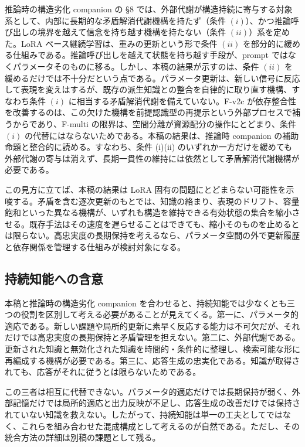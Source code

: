 \documentclass[12pt,a4paper]{article}
\begin{document}
推論時の構造劣化 companion の §8 では、外部代謝が構造持続に寄与する対象系として、内部に長期的な矛盾解消代謝機構を持たず（条件 \((i)\)）、かつ推論呼び出しの境界を越えて信念を持ち越す機構を持たない（条件 \((ii)\)）系を定めた。LoRA ベース継続学習は、重みの更新という形で条件 \((ii)\) を部分的に緩める仕組みである。推論呼び出しを越えて状態を持ち越す手段が、prompt ではなくパラメータそのものに移る。しかし、本稿の結果が示すのは、条件 \((ii)\) を緩めるだけでは不十分だという点である。パラメータ更新は、新しい信号に反応して表現を変えはするが、既存の派生知識との整合を自律的に取り直す機構、すなわち条件 \((i)\) に相当する矛盾解消代謝を備えていない。F-v2c が依存整合性を改善するのは、この欠けた機構を前提認識型の再提示という外部プロセスで補うからであり、F-multi の限界は、空間分離が資源配分の操作にとどまり、条件 \((i)\) の代替にはならないためである。本稿の結果は、推論時 companion の補助命題と整合的に読める。すなわち、条件 (i)(ii) のいずれか一方だけを緩めても外部代謝の寄与は消えず、長期一貫性の維持には依然として矛盾解消代謝機構が必要である。

この見方に立てば、本稿の結果は LoRA 固有の問題にとどまらない可能性を示唆する。矛盾を含む逐次更新のもとでは、知識の絡まり、表現のドリフト、容量飽和といった異なる機構が、いずれも構造を維持できる有効状態の集合を縮小させる。既存手法はその速度を遅らせることはできても、縮小そのものを止めるとは限らない。高忠実度の長期保持を考えるなら、パラメータ空間の外で更新履歴と依存関係を管理する仕組みが検討対象になる。

\subsection{持続知能への含意}\label{ux6301ux7d9aux77e5ux80fdux3078ux306eux542bux610f}

本稿と推論時の構造劣化 companion を合わせると、持続知能では少なくとも三つの役割を区別して考える必要があることが見えてくる。第一に、パラメータ的適応である。新しい課題や局所的更新に素早く反応する能力は不可欠だが、それだけでは高忠実度の長期保持と矛盾管理を担えない。第二に、外部代謝である。更新された知識と無効化された知識を時間的・条件的に整理し、検索可能な形に再編成する機構が必要である。第三に、応答生成の忠実化である。知識が取得されても、応答がそれに従うとは限らないためである。

この三者は相互に代替できない。パラメータ的適応だけでは長期保持が弱く、外部記憶だけでは局所的適応と出力反映が不足し、応答生成の改善だけでは保持されていない知識を救えない。したがって、持続知能は単一の工夫としてではなく、これらを組み合わせた混成構成として考えるのが自然である。ただし、その統合方法の詳細は別稿の課題として残る。
\end{document}
